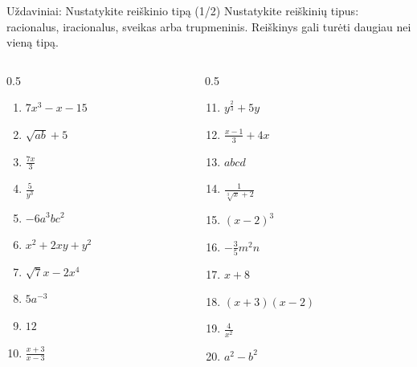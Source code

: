 \documentclass[aspectratio=169, 10pt]{beamer}
\begin{document}
\begin{frame}{Uždaviniai: Nustatykite reiškinio tipą (1/2)}
    Nustatykite reiškinių tipus: racionalus, iracionalus, sveikas arba trupmeninis. Reiškinys gali turėti daugiau nei vieną tipą.
    
    \vspace{0.3cm}
    \begin{columns}[T]
        \begin{column}{0.5\textwidth}
            \begin{enumerate}
                \item $7x^3 - x - 15$
                \item $\sqrt{ab} + 5$
                \item $\frac{7x}{3}$
                \item $\frac{5}{y^3}$
                \item $-6a^3bc^2$
                \item $x^2 + 2xy + y^2$
                \item $\sqrt{7}x - 2x^4$
                \item $5a^{-3}$
                \item $12$
                \item $\frac{x+3}{x-3}$
            \end{enumerate}
        \end{column}
        
        \begin{column}{0.5\textwidth}
            \begin{enumerate}
                \setcounter{enumi}{10}
                \item $y^{\frac{2}{3}} + 5y$
                \item $\frac{x-1}{3} + 4x$
                \item $abcd$
                \item $\frac{1}{\sqrt[3]{x}+2}$
                \item $(x-2)^3$
                \item $-\frac{3}{5}m^2n$
                \item $x + 8$
                \item $(x+3)(x-2)$
                \item $\frac{4}{x^2}$
                \item $a^2 - b^2$
            \end{enumerate}
        \end{column}
    \end{columns}
\end{frame}
\end{document}
